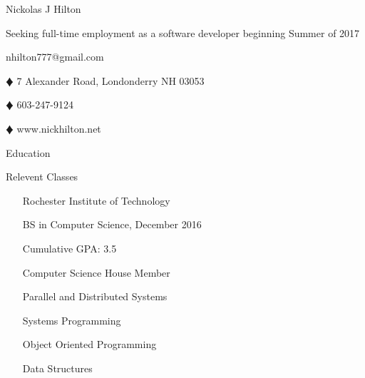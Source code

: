 \documentclass{article}
\newcommand{\lineseparator}[1]{\noindent\makebox[\linewidth]{\rule{\textwidth}{#1}}}
\begin{document}
\begin{minipage}[t]{0.4\textwidth}
  \hspace{-6.5mm}
  {\Huge Nickolas J Hilton }
\end{minipage}
\hspace{-6.5mm}
\begin{minipage}[b]{0.6\textwidth}
  \begin{flushright}
    {\small Seeking full-time employment as a software developer beginning Summer of 2017 }
  \end{flushright}
\end{minipage}
\vspace{1mm}
\lineseparator{1.5pt}
\vspace{-2mm}
\begin{center}
  nhilton777@gmail.com 
  \begin{inparaitem}
  \item[$\vardiamond$] 7 Alexander Road, Londonderry NH 03053     
  \item[$\vardiamond$] 603-247-9124 
  \item[$\vardiamond$] www.nickhilton.net 
  \end{inparaitem}
\end{center}
\begin{minipage}[t]{0.5\textwidth}
  {\Large Education } 
\end{minipage}
\begin{minipage}[t]{0.5\textwidth}
  {\Large Relevent Classes } 
\end{minipage}
\lineseparator{0.5pt}
\vspace{4mm}
\begin{minipage}[t]{0.5\textwidth}
  \vspace{0.5mm}
  \begin{itemize}[leftmargin=4mm]
    \item[] Rochester Institute of Technology  \vspace{-2mm}  
    \item[] BS in Computer Science, December 2016 \vspace{-2mm}  
    \item[] Cumulative GPA: 3.5 \vspace{-2mm}  
    \item[] Computer Science House Member  
  \end{itemize}
\end{minipage}
\begin{minipage}[t]{0.5\textwidth}
  \vspace{0.5mm}
  \begin{itemize}[leftmargin=4mm]
    \item[] Parallel and Distributed Systems \vspace{-2mm}  
    \item[] Systems Programming \vspace{-2mm}  
    \item[] Object Oriented Programming \vspace{-2mm}  
    \item[] Data Structures 
  \end{itemize}
\end{minipage}
\end{document}
